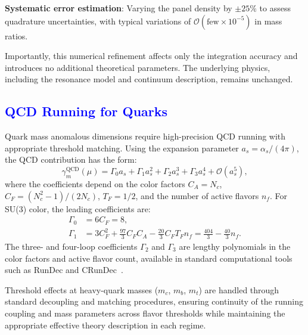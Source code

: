 \documentclass[%
amsmath,amssymb,
aps,
prb,
floatfix, showkeys, 10pt,
]{revtex4-2}
\newcommand{\modif}[1]{\textcolor{blue}{#1}}
\begin{document}
\textbf{Systematic error estimation}: Varying the panel density by $\pm 25\%$
to assess quadrature uncertainties, with typical variations of $\mathcal{O}(\text{few} \times 10^{-5})$ in mass ratios.

Importantly, this numerical refinement affects only the integration accuracy and introduces no additional theoretical parameters. The underlying physics, including the resonance model and continuum description, remains unchanged.









{\modif{  \subsection{QCD Running for Quarks}
\label{subsec:qcd_running}  }}
Quark mass anomalous dimensions require high-precision QCD running with appropriate threshold matching. Using the expansion parameter $a_s = \alpha_s/(4\pi)$, the QCD contribution has the form:
\begin{equation}
\gamma_m^{\text{QCD}}(\mu) = \Gamma_0 a_s + \Gamma_1 a_s^2 + \Gamma_2 a_s^3 + \Gamma_3 a_s^4 + \mathcal{O}(a_s^5),
\label{eq:qcd_gamma_expansion}
\end{equation}
where the coefficients depend on the color factors $C_A = N_c$, $C_F = (N_c^2-1)/(2N_c)$, $T_F = 1/2$, and the number of active flavors $n_f$.
For SU(3) color, the leading coefficients are:
\begin{align}
\Gamma_0 &= 6C_F = 8, \label{eq:Gamma0} \\
\Gamma_1 &= 3C_F^2 + \frac{97}{3}C_F C_A - \frac{20}{3}C_F T_F n_f
= \frac{404}{3} - \frac{40}{3}n_f.  \label{eq:Gamma1} 
\end{align}
The three- and four-loop coefficients $\Gamma_2$ and $\Gamma_3$ are lengthy polynomials in the color factors and active flavor count, available in standard computational tools such as RunDec and CRunDec~\cite{ChetyrkinKuehnSteinhauser2000,HerrenSteinhauser2018}.

Threshold effects at heavy-quark masses ($m_c$, $m_b$, $m_t$) are handled through standard decoupling and matching procedures, ensuring continuity of the running coupling and mass parameters across flavor thresholds while maintaining the appropriate effective theory description in each regime.
\end{document}
